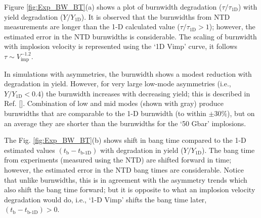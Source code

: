 \documentclass[aip,reprint]{revtex4-1}
\begin{document}
%
%
%
%
%
%

Figure \ref{fig:Exp_BW_BT}(a) shows a plot of burnwidth degradation ($\tau/\tau_\text{1D}$) with yield degradation ($Y/Y_\text{1D}$). It is observed that the burnwidths from NTD measurements are longer than the 1-D calculated value ($\tau/\tau_\text{1D} > 1$); however, the estimated error in the NTD burnwidths is considerable. The scaling of burnwidth with implosion velocity is represented using the `1D Vimp' curve, it follows $\tau \sim V_\text{imp}^{-1.2}$.

 In simulations with asymmetries, the burnwidth shows a modest reduction with degradation in yield. However, for very large low-mode asymmetries (i.e., $Y/Y_\text{1D}<0.4$) the burnwidth increases with decreasing yield; this is described in Ref. []. Combination of low and mid modes (shown with gray) produce burnwidths that are comparable to the 1-D burnwidth (to within $\pm 30\%$), but on an average they are shorter than the burnwidths for the `50 Gbar' implosions.

%
%
%
%
%
 The Fig. \ref{fig:Exp_BW_BT}(b) shows shift in bang time compared to the 1-D estimated values $(t_\text{b}-t_\text{b-1D})$ with degradation in yield ($Y/Y_\text{1D}$). The bang time from experiments (measured using the NTD) are shifted forward in time; however, the estimated error in the NTD bang times are considerable. Notice that unlike burnwidths, this is in agreement with the asymmetry trends which also shift the bang time forward; but it is opposite to what an implosion velocity degradation would do, i.e., `1-D Vimp' shifts the bang time later, $(t_\text{b}-t_\text{b-1D}) > 0$. 
\end{document}
